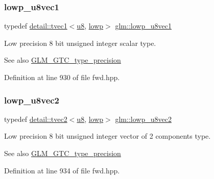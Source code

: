 \subsubsection{\texorpdfstring{lowp\+\_\+u8vec1}{lowp\_u8vec1}}
{\footnotesize\ttfamily typedef \hyperlink{structglm_1_1detail_1_1tvec1}{detail\+::tvec1}$<$\hyperlink{group__gtc__type__precision_ga5e3dc67373d5068997d2d9f41c9024d2}{u8}, \hyperlink{namespaceglm_a0f04f086094c747d227af4425893f545ae161af3fc695e696ce3bf69f7332bc2d}{lowp}$>$ \hyperlink{group__gtc__type__precision_gaee3cba2c93fa8cb7295671908995197c}{glm\+::lowp\+\_\+u8vec1}}

Low precision 8 bit unsigned integer scalar type. \begin{DoxySeeAlso}{See also}
\hyperlink{group__gtc__type__precision}{G\+L\+M\+\_\+\+G\+T\+C\+\_\+type\+\_\+precision} 
\end{DoxySeeAlso}


Definition at line 930 of file fwd.\+hpp.

\mbox{\label{group__gtc__type__precision_ga8e5a056cbbcb70dca5c65950fa13a787}} 
\subsubsection{\texorpdfstring{lowp\+\_\+u8vec2}{lowp\_u8vec2}}
{\footnotesize\ttfamily typedef \hyperlink{structglm_1_1detail_1_1tvec2}{detail\+::tvec2}$<$\hyperlink{group__gtc__type__precision_ga5e3dc67373d5068997d2d9f41c9024d2}{u8}, \hyperlink{namespaceglm_a0f04f086094c747d227af4425893f545ae161af3fc695e696ce3bf69f7332bc2d}{lowp}$>$ \hyperlink{group__gtc__type__precision_ga8e5a056cbbcb70dca5c65950fa13a787}{glm\+::lowp\+\_\+u8vec2}}

Low precision 8 bit unsigned integer vector of 2 components type. \begin{DoxySeeAlso}{See also}
\hyperlink{group__gtc__type__precision}{G\+L\+M\+\_\+\+G\+T\+C\+\_\+type\+\_\+precision} 
\end{DoxySeeAlso}


Definition at line 934 of file fwd.\+hpp.

\mbox{\label{group__gtc__type__precision_gaf0d7154052c636edf4a902fc8a4a56f2}} 
